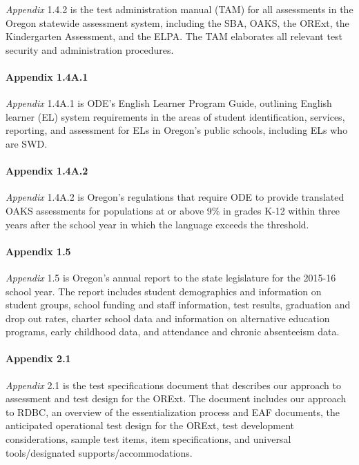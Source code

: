 \documentclass[]{article}
\let\oldparagraph\paragraph
\renewcommand{\paragraph}[1]{\oldparagraph{#1}\mbox{}}
\begin{document}
\emph{Appendix} 1.4.2 is the test administration manual (TAM) for all
assessments in the Oregon statewide assessment system, including the
SBA, OAKS, the ORExt, the Kindergarten Assessment, and the ELPA. The TAM
elaborates all relevant test security and administration procedures.

\hypertarget{appendix-1.4a.1}{%
\paragraph{Appendix 1.4A.1}\label{appendix-1.4a.1}}

\emph{Appendix} 1.4A.1 is ODE's English Learner Program Guide, outlining
English learner (EL) system requirements in the areas of student
identification, services, reporting, and assessment for ELs in Oregon's
public schools, including ELs who are SWD.

\hypertarget{appendix-1.4a.2}{%
\paragraph{Appendix 1.4A.2}\label{appendix-1.4a.2}}

\emph{Appendix} 1.4A.2 is Oregon's regulations that require ODE to
provide translated OAKS assessments for populations at or above 9\% in
grades K-12 within three years after the school year in which the
language exceeds the threshold.

\hypertarget{appendix-1.5}{%
\paragraph{Appendix 1.5}\label{appendix-1.5}}

\emph{Appendix} 1.5 is Oregon's annual report to the state legislature
for the 2015-16 school year. The report includes student demographics
and information on student groups, school funding and staff information,
test results, graduation and drop out rates, charter school data and
information on alternative education programs, early childhood data, and
attendance and chronic absenteeism data.

\hypertarget{appendix-2.1}{%
\paragraph{Appendix 2.1}\label{appendix-2.1}}

\emph{Appendix} 2.1 is the test specifications document that describes
our approach to assessment and test design for the ORExt. The document
includes our approach to RDBC, an overview of the essentialization
process and EAF documents, the anticipated operational test design for
the ORExt, test development considerations, sample test items, item
specifications, and universal tools/designated supports/accommodations.
\end{document}

